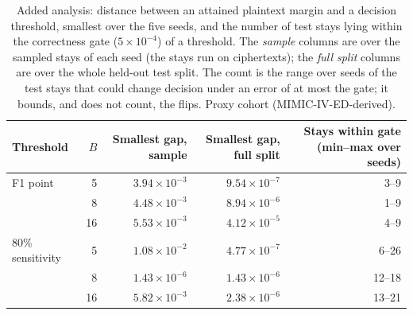 \begin{table}[t]
\centering
\caption{Added analysis: distance between an attained plaintext margin and a decision threshold, smallest over the five seeds, and the number of test stays lying within the correctness gate ($5\times10^{-4}$) of a threshold. The \emph{sample} columns are over the sampled stays of each seed (the stays run on ciphertexts); the \emph{full split} columns are over the whole held-out test split. The count is the range over seeds of the test stays that could change decision under an error of at most the gate; it bounds, and does not count, the flips. Proxy cohort (MIMIC-IV-ED-derived).}
\label{tab:s11_margin_gaps}
\begin{tabular}{lrrrr}
\toprule
Threshold & $B$ & Smallest gap, sample & Smallest gap, full split & Stays within gate (min--max over seeds) \\
\midrule
F1 point & 5 & $3.94 \times 10^{-3}$ & $9.54 \times 10^{-7}$ & 3--9 \\
 & 8 & $4.48 \times 10^{-3}$ & $8.94 \times 10^{-6}$ & 1--9 \\
 & 16 & $5.53 \times 10^{-3}$ & $4.12 \times 10^{-5}$ & 4--9 \\
\midrule
80\% sensitivity & 5 & $1.08 \times 10^{-2}$ & $4.77 \times 10^{-7}$ & 6--26 \\
 & 8 & $1.43 \times 10^{-6}$ & $1.43 \times 10^{-6}$ & 12--18 \\
 & 16 & $5.82 \times 10^{-3}$ & $2.38 \times 10^{-6}$ & 13--21 \\
\bottomrule
\end{tabular}
\end{table}
